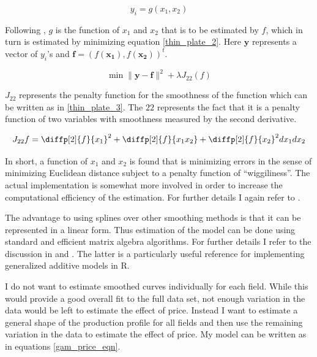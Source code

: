 \documentclass[11pt]{article}
\begin{document}
	\begin{equation}
	y_i = g(x_1, x_2)
	\label{thin_plate_1}
	\end{equation}

Following \citet{wood_generalized_2006}, $g$ is the function of $x_1$ and $x_2$ that is to be estimated by $f$, which in turn is estimated by minimizing equation \ref{thin_plate_2}.  Here $\boldsymbol{y}$ represents a vector of $y_i$’s and $\boldsymbol{f} = (f(\boldsymbol{x_1}),f(\boldsymbol{x_2}))^t$.   

	\begin{equation}
\min \|\boldsymbol{y-f}\|^2 + \lambda J_{22}(f)
\label{thin_plate_2}
	\end{equation}

$J_{22}$ represents the penalty function for the smoothness of the function which can be written as in \ref{thin_plate_3}.  The $22$ represents the fact that it is a penalty function of two variables with smoothness measured by the second derivative.

	\begin{equation}
	J_{22}{f}= \diffp[2]{f}{x_1}^2 + \diffp[2]{f}{{x_1}{x_2}} + \diffp[2]{f}{x_2}^2dx_1 dx_2
\label{thin_plate_3}
	\end{equation}

In short, a function of $x_1$ and $x_2$ is found that is minimizing errors in the sense of minimizing Euclidean distance subject to a penalty function of “wiggiliness”.  The actual implementation is somewhat more involved in order to increase the computational efficiency of the estimation.  For further details I again refer to \citet{wood_thin_2003}.

The advantage to using splines over other smoothing methods is that it can be represented in a linear form.  Thus estimation of the model can be done using standard and efficient matrix algebra algorithms. For further details I refer to the discussion in \citet{hastie_generalized_1990} and \citet{wood_generalized_2006}.  The latter is a particularly useful reference for implementing generalized additive models in R.

I do not want to estimate smoothed curves individually for each field.  While this would provide a good overall fit to the full data set, not enough variation in the data would be left to estimate the effect of price.  Instead I want to estimate a general shape of the production profile for all fields and then use the remaining variation in the data to estimate the effect of price.  My model can be written as in equations \ref{gam_price_eqn}.
\end{document}
